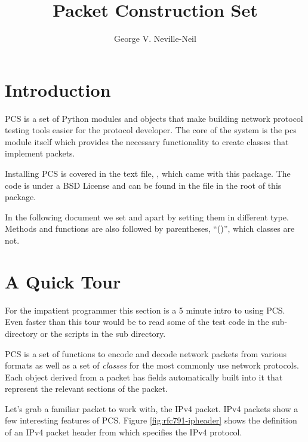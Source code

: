 \documentclass[11pt]{article}
\title{Packet Construction Set}
\author{George V. Neville-Neil}
\begin{document}
\maketitle

\section{Introduction}

PCS is a set of Python modules and objects that make building network
protocol testing tools easier for the protocol developer.  The core of
the system is the pcs module itself which provides the necessary
functionality to create classes that implement packets.

Installing PCS is covered in the text file, , which came
with this package.  The code is under a BSD License and can be found
in the file  in the root of this package.

In the following document we set  
 and  apart by setting them in
different type.  Methods and functions are also followed by
parentheses, ``()'', which classes are not.


\section{A Quick Tour}

For the impatient programmer this section is a 5 minute intro to using
PCS.  Even faster than this tour would be to read some of the test
code in the  sub-directory or the scripts in the
 sub directory.

PCS is a set of functions to encode and decode network packets from
various formats as well as a set of \emph{classes} for the most
commonly use network protocols.  Each object derived from a packet has
fields automatically built into it that represent the relevant
sections of the packet.  

Let's grab a familiar packet to work with, the IPv4 packet.  IPv4
packets show a few interesting features of PCS.  Figure
\ref{fig:rfc791-ipheader} shows the definition of an IPv4 packet
header from \cite{rfc791} which specifies the IPv4 protocol.  
\end{document}

